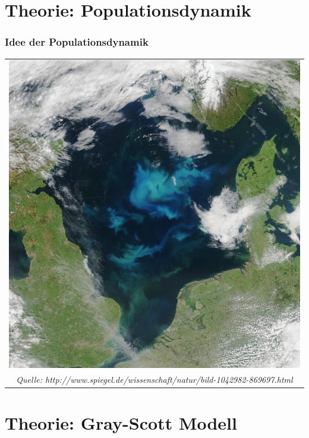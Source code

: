 \documentclass[aspectratio=32]{beamer}
\newcommand{\sectionframe}{\begin{frame}
	\begin{center}
		\textcolor{simtechred}{\Large\insertsection}
	\end{center}
\end{frame}}
\begin{document}
\section{Theorie: Populationsdynamik}
\sectionframe

\begin{frame}
\frametitle{Idee der Populationsdynamik}

\begin{tabular}{c}
	\includegraphics[height=\textheight/3*2,keepaspectratio]{Bilder/seaweed.jpg}
	\\
	{\small \textit{Quelle: http://www.spiegel.de/wissenschaft/natur/bild-1042982-869697.html}}
	\\
\end{tabular}

\end{frame}

\section{Theorie: Gray-Scott Modell}
\sectionframe
\end{document}

